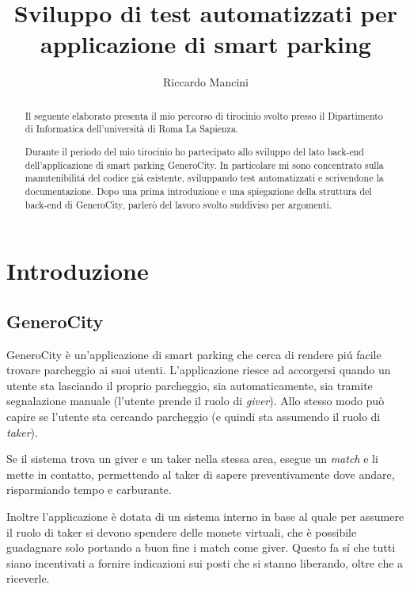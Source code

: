 \documentclass[italian, oneside]{sapthesis} %
\title{Sviluppo di test automatizzati per applicazione di smart parking}
\author{Riccardo Mancini}
\begin{document}
\frontmatter
\maketitle{}



\begin{abstract}
	Il seguente elaborato presenta il mio percorso di tirocinio svolto presso il Dipartimento di Informatica dell'università di Roma La Sapienza.

	Durante il periodo del mio tirocinio ho partecipato allo sviluppo del lato back-end dell'applicazione di smart parking GeneroCity. In particolare mi sono concentrato sulla manutenibilit\'a del codice gi\'a esistente, sviluppando test automatizzati e scrivendone la documentazione. Dopo una prima introduzione e una spiegazione della struttura del back-end di GeneroCity, parler\`o del lavoro svolto suddiviso per argomenti.
\end{abstract}

\tableofcontents
\mainmatter
\chapter{Introduzione}
	\section{GeneroCity}
		GeneroCity \`e un'applicazione di smart parking che cerca di rendere pi\'u facile trovare parcheggio ai suoi utenti. 
		L'applicazione riesce ad accorgersi quando un utente sta lasciando il proprio parcheggio, sia automaticamente, sia tramite segnalazione manuale (l'utente prende il ruolo di \textit{giver}). Allo stesso modo pu\`o capire se l'utente sta cercando parcheggio (e quindi sta assumendo il ruolo di \textit{taker}).

		Se il sistema trova un giver e un taker nella stessa area, esegue un \textit{match} e li mette in contatto, permettendo al taker di sapere preventivamente dove andare, risparmiando tempo e carburante. 
		
		Inoltre l'applicazione \`e dotata di un sistema interno in base al quale per assumere il ruolo di taker si devono spendere delle monete virtuali, che \`e possibile guadagnare solo portando a buon fine i match come giver. Questo fa s\'i che tutti siano incentivati a fornire indicazioni sui posti che si stanno liberando, oltre che a riceverle.
\end{document}
